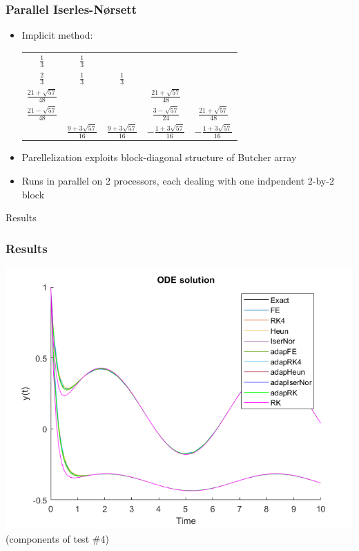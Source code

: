 \documentclass{beamer}
\begin{document}
\begin{frame} %
	\frametitle{Parallel Iserles-Nørsett}
	\begin{itemize}
		\item Implicit method:
		\begin{center}
			\begin{tabular}{c|cccc}
				$\frac{1}{3}$ & $\frac{1}{3}$ & & & \\
				$\frac{2}{3}$ & $\frac{1}{3}$ & $\frac{1}{3}$ & & \\
				$\frac{21+\sqrt{57}}{48}$ & & & $\frac{21+\sqrt{57}}{48}$ & \\
				$\frac{21-\sqrt{57}}{48}$ & & & $\frac{3-\sqrt{57}}{24}$ & $\frac{21+\sqrt{57}}{48}$ \\
				\hline
				& $\frac{9+3\sqrt{57}}{16}$ & $\frac{9+3\sqrt{57}}{16}$ & $-\frac{1+3\sqrt{57}}{16}$ & $-\frac{1+3\sqrt{57}}{16}$
			\end{tabular}
		\vspace{20pt}
		\end{center}
		\item Parellelization exploits block-diagonal structure of Butcher array
		\item Runs in parallel on 2 processors, each dealing with one indpendent 2-by-2 block
	\end{itemize}
\end{frame}


\begin{frame}[c] %
\begin{center}
	\Huge \color{blue} Results
\end{center}
\end{frame}


\begin{frame} %
	\frametitle{Results}
	\begin{center}
		\includegraphics[width=0.8\linewidth]{etc/results_test_4.png} \\
		(components of test \#4)
	\end{center}
\end{frame}
\end{document}
